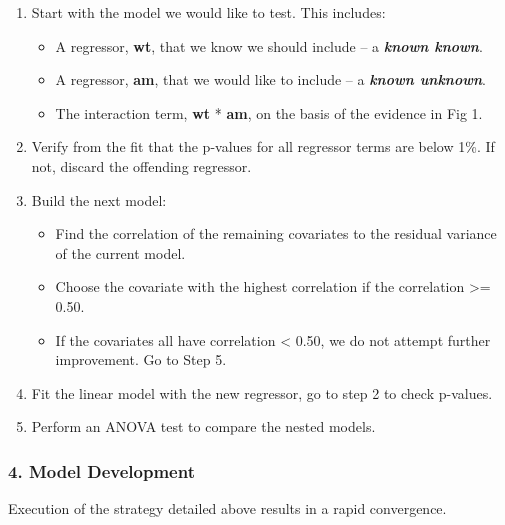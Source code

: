 \documentclass[10pt,]{article}
\begin{document}
\begin{enumerate}
\def\labelenumi{\arabic{enumi}.}
\itemsep1pt\parskip0pt
\item
  Start with the model we would like to test. This includes:

  \begin{itemize}
  \itemsep1pt\parskip0pt
  \item
    A regressor, \textbf{wt}, that we know we should include -- a
    \textbf{\emph{known known}}.
  \item
    A regressor, \textbf{am}, that we would like to include -- a
    \textbf{\emph{known unknown}}.
  \item
    The interaction term, \textbf{wt} * \textbf{am}, on the basis of the
    evidence in Fig 1.
  \end{itemize}
\item
  Verify from the fit that the p-values for all regressor terms are
  below 1\%. If not, discard the offending regressor.
\item
  Build the next model:

  \begin{itemize}
  \itemsep1pt\parskip0pt
  \item
    Find the correlation of the remaining covariates to the residual
    variance of the current model.
  \item
    Choose the covariate with the highest correlation if the
    \textbar{}correlation\textbar{} \textgreater{}= 0.50.
  \item
    If the covariates all have \textbar{}correlation\textbar{}
    \textless{} 0.50, we do not attempt further improvement. Go to Step
    5.
  \end{itemize}
\item
  Fit the linear model with the new regressor, go to step 2 to check
  p-values.
\item
  Perform an ANOVA test to compare the nested models.
\end{enumerate}

\subsubsection{4. Model Development}\label{model-development}

Execution of the strategy detailed above results in a rapid convergence.
\end{document}
